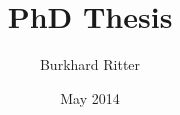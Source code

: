 \documentclass[11pt]{book}
\begin{document}
\graphicspath{}

\title{PhD Thesis}
\author{Burkhard Ritter}
\date{May 2014}
\maketitle

\tableofcontents






{}

\end{document}
